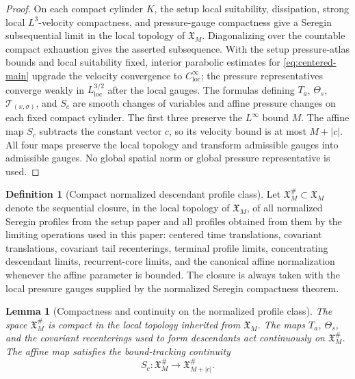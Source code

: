 \documentclass[11pt]{amsart}
\numberwithin{equation}{section}
\theoremstyle{plain}
\newtheorem{lemma}[lemma]{Lemma}
\theoremstyle{definition}
\newtheorem{definition}[definition]{Definition}
\theoremstyle{remark}
\newcommand{\loc}{\mathrm{loc}}
\begin{document}
\begin{proof}
On each compact cylinder \(K\), the setup local suitability, dissipation,
strong local \(L^3\)-velocity compactness, and pressure-gauge compactness give
a Seregin subsequential limit in the local topology of \(\mathfrak X_M\).
Diagonalizing over the countable compact exhaustion gives the asserted
subsequence.  With the setup pressure-atlas bounds and local suitability fixed,
interior parabolic estimates for \eqref{eq:centered-main} upgrade the velocity
convergence to \(C^\infty_{\loc}\); the pressure representatives converge
weakly in \(L^{3/2}_{\loc}\) after the local gauges.  The formulas defining \(T_a\),
\(\Theta_s\), \(\mathscr T_{(x,\sigma)}\), and \(S_c\) are smooth changes of
variables and affine pressure changes on each fixed compact cylinder.  The
first three preserve the \(L^\infty\) bound \(M\).  The affine map \(S_c\)
subtracts the constant vector \(c\), so its velocity bound is at most
\(M+|c|\).  All four maps preserve the local topology and transform admissible
gauges into admissible gauges.  No global spatial norm or global pressure
representative is used.
\end{proof}

\begin{definition}[Compact normalized descendant profile class]
\label{def:compact-normalized-state-space}
Let \(\mathfrak X_M^\#\subset\mathfrak X_M\) denote the sequential closure, in
the local topology of \(\mathfrak X_M\), of all normalized Seregin profiles from
the setup paper and all profiles obtained from them by the limiting operations used
in this paper: centered time translations, covariant translations, covariant
tail recenterings, terminal profile limits, concentrating descendant limits, recurrent-core
limits, and the canonical affine normalization whenever the affine parameter is
bounded.  The closure is always taken with the local pressure gauges supplied by
the normalized Seregin compactness theorem.
\end{definition}

\begin{lemma}[Compactness and continuity on the normalized profile class]
\label{lem:compact-normalized-state-space}
The space \(\mathfrak X_M^\#\) is compact in the local topology inherited from
\(\mathfrak X_M\).  The maps \(T_a\), \(\Theta_s\), and the covariant
recenterings used to form descendants act continuously on
\(\mathfrak X_M^\#\).  The affine map satisfies the bound-tracking continuity
\[
   S_c:\mathfrak X_M^\#\longrightarrow \mathfrak X_{M+|c|}^\# .
\]
\end{lemma}
\end{document}

